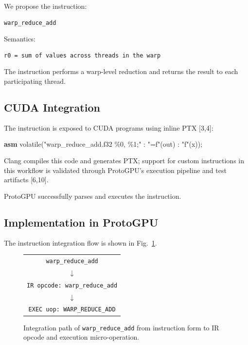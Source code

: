 \documentclass[11pt]{article}
\newenvironment{Shaded}{}{}
\newcommand{\AttributeTok}[1]{\textcolor[rgb]{0.49,0.56,0.16}{#1}}
\newcommand{\KeywordTok}[1]{\textcolor[rgb]{0.00,0.44,0.13}{\textbf{#1}}}
\newcommand{\NormalTok}[1]{#1}
\newcommand{\OperatorTok}[1]{\textcolor[rgb]{0.40,0.40,0.40}{#1}}
\newcommand{\StringTok}[1]{\textcolor[rgb]{0.25,0.44,0.63}{#1}}
\begin{document}
We propose the instruction:

\begin{lstlisting}
warp_reduce_add
\end{lstlisting}

Semantics:

\begin{lstlisting}
r0 = sum of values across threads in the warp
\end{lstlisting}

The instruction performs a warp-level reduction and returns the result
to each participating thread.


\hypertarget{cuda-integration-1}{%
\subsection{CUDA Integration}\label{cuda-integration-1}}

The instruction is exposed to CUDA programs using inline PTX [3,4]:

\begin{Shaded}
\begin{Highlighting}[]
\KeywordTok{asm} \AttributeTok{volatile}\OperatorTok{(}\StringTok{"warp\_reduce\_add.f32 \%0, \%1;"} \OperatorTok{:} \StringTok{"=f"}\OperatorTok{(}\NormalTok{out}\OperatorTok{)} \OperatorTok{:} \StringTok{"f"}\OperatorTok{(}\NormalTok{x}\OperatorTok{));}
\end{Highlighting}
\end{Shaded}

Clang compiles this code and generates PTX; support for custom
instructions in this workflow is validated through ProtoGPU's execution
pipeline and test artifacts [6,10].

ProtoGPU successfully parses and executes the instruction.


\hypertarget{implementation-in-protogpu}{%
\subsection{Implementation in
ProtoGPU}\label{implementation-in-protogpu}}

The instruction integration flow is shown in Fig.~\ref{fig:warp-reduce-add-integration}.

\begin{figure}[H]
\centering
\begin{tabular}{c}
\texttt{warp\_reduce\_add} \\
$\downarrow$ \\
\texttt{IR opcode: warp\_reduce\_add} \\
$\downarrow$ \\
\texttt{EXEC uop: WARP\_REDUCE\_ADD}
\end{tabular}
\caption{Integration path of \texttt{warp\_reduce\_add} from instruction form to IR opcode and execution micro-operation.}
\label{fig:warp-reduce-add-integration}
\end{figure}
\end{document}
